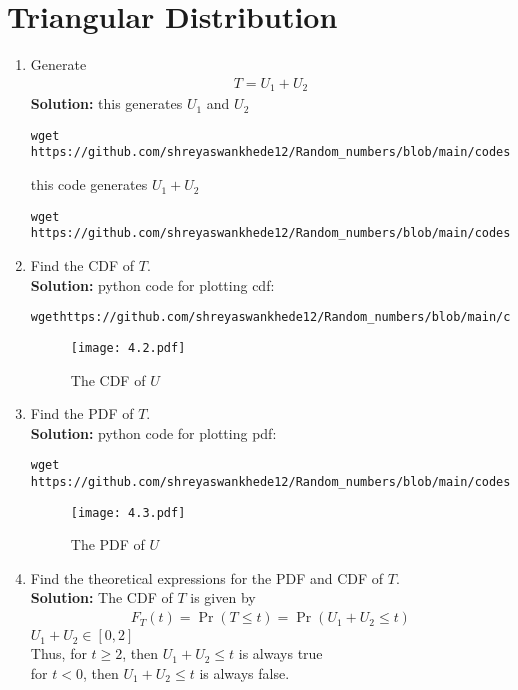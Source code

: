 \documentclass[journal,12pt,twocolumn]{IEEEtran}
\renewcommand\thesection{\arabic{section}}
\providecommand{\pr}[1]{\ensuremath{\Pr\left(#1\right)}}
\theoremstyle{remark}
\newcommand{\solution}{\noindent \textbf{Solution: }}
\numberwithin{equation}{section}
\begin{document}
\section{Triangular Distribution}
\begin{enumerate}[label=\thesection.\arabic*
,ref=\thesection.\theenumi]
%
\item Generate 
	\begin{align}
		T = U_1+U_2
	\end{align}
\solution
this generates $U_1$ and $U_2$
\begin{lstlisting}
wget https://github.com/shreyaswankhede12/Random_numbers/blob/main/codes/4.1_gen_u1_u2.c
\end{lstlisting}
this code generates $U_1 + U_2$
\begin{lstlisting}
wget https://github.com/shreyaswankhede12/Random_numbers/blob/main/codes/4.1_gen_u1+u2.c
\end{lstlisting} 
\item Find the CDF of $T$.\\
\solution python code for plotting cdf:
\begin{lstlisting}
wgethttps://github.com/shreyaswankhede12/Random_numbers/blob/main/codes/4.2.py
\end{lstlisting}
\begin{figure}
\centering
\texttt{[image: 4.2.pdf]}
\caption{The CDF of $U$}
\label{fig:4.2}
\end{figure}
\item Find the PDF of $T$.\\
\solution python code for plotting pdf:
\begin{lstlisting}
wget https://github.com/shreyaswankhede12/Random_numbers/blob/main/codes/4.3.py
\end{lstlisting}
\begin{figure}
\centering
\texttt{[image: 4.3.pdf]}
\caption{The PDF of $U$}
\label{fig:4.3}
\end{figure} 
\item Find the theoretical expressions for the PDF and CDF of $T$.\\
\solution The CDF of $T$ is given by
	\begin{align}
		F_T(t) = \pr{T \le t} = \pr{U_1 + U_2 \le t}	
	\end{align}		
	$ U_1 + U_2 \in [0,2]$\\
	Thus, for $t \ge 2$, then $U_1 + U_2 \le t$ is always true\\  for $t < 0$, then $U_1 + U_2 \le t$ is always false.
	

\end{enumerate}
\end{document}
